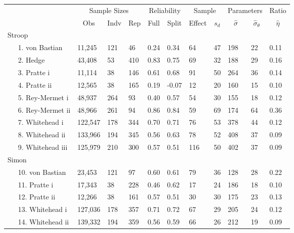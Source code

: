 \documentclass[
  ,man]{apa6}
\begin{document}
\begin{table}[tbp]
\begin{center}
\begin{threeparttable}
\begin{tabular}{lllllllllll}
\toprule
 & \multicolumn{3}{c}{Sample Sizes} & \multicolumn{2}{c}{Reliability} & \multicolumn{2}{c}{Sample} & \multicolumn{2}{c}{Parameters} & \multicolumn{1}{c}{Ratio} \\
\cmidrule(r){2-4} \cmidrule(r){5-6} \cmidrule(r){7-8} \cmidrule(r){9-10} \cmidrule(r){11-11}
 & \multicolumn{1}{c}{Obs} & \multicolumn{1}{c}{Indv} & \multicolumn{1}{c}{Rep} & \multicolumn{1}{c}{Full} & \multicolumn{1}{c}{Split} & \multicolumn{1}{c}{Effect} & \multicolumn{1}{c}{$s_d$} & \multicolumn{1}{c}{$\hat{\sigma}$} & \multicolumn{1}{c}{$\hat{\sigma}_{\theta}$} & \multicolumn{1}{c}{$\hat{\eta}$}\\
\midrule
Stroop &  &  &  &  &  &  &  &  &  & \\
\ \ \ 1. von Bastian & 11,245 & 121 & 46 & 0.24 & 0.34 & 64 & 47 & 198 & 22 & 0.11\\
\ \ \ 2. Hedge & 43,408 & 53 & 410 & 0.83 & 0.75 & 69 & 32 & 188 & 29 & 0.16\\
\ \ \ 3. Pratte i & 11,114 & 38 & 146 & 0.61 & 0.68 & 91 & 50 & 264 & 36 & 0.14\\
\ \ \ 4. Pratte ii & 12,565 & 38 & 165 & 0.19 & -0.07 & 12 & 20 & 160 & 15 & 0.10\\
\ \ \ 5. Rey-Mermet i & 48,937 & 264 & 93 & 0.40 & 0.57 & 54 & 30 & 155 & 18 & 0.12\\
\ \ \ 6. Rey-Mermet ii & 48,966 & 261 & 94 & 0.86 & 0.84 & 59 & 69 & 174 & 64 & 0.36\\
\ \ \ 7. Whitehead i & 122,547 & 178 & 344 & 0.70 & 0.71 & 76 & 53 & 378 & 44 & 0.12\\
\ \ \ 8. Whitehead ii & 133,966 & 194 & 345 & 0.56 & 0.63 & 78 & 52 & 408 & 37 & 0.09\\
\ \ \ 9. Whitehead iii & 125,979 & 210 & 300 & 0.57 & 0.51 & 116 & 50 & 402 & 37 & 0.09\\
Simon &  &  &  &  &  &  &  &  &  & \\
\ \ \ 10. von Bastian & 23,453 & 121 & 97 & 0.60 & 0.61 & 79 & 36 & 128 & 28 & 0.22\\
\ \ \ 11. Pratte i & 17,343 & 38 & 228 & 0.46 & 0.62 & 17 & 24 & 186 & 18 & 0.10\\
\ \ \ 12. Pratte ii & 12,266 & 38 & 161 & 0.57 & 0.51 & 30 & 30 & 175 & 23 & 0.13\\
\ \ \ 13. Whitehead i & 127,036 & 178 & 357 & 0.71 & 0.72 & 67 & 29 & 205 & 24 & 0.12\\
\ \ \ 14. Whitehead ii & 139,332 & 194 & 359 & 0.56 & 0.59 & 66 & 26 & 212 & 19 & 0.09\\

\end{tabular}
\end{threeparttable}
\end{center}
\end{table}
\end{document}
